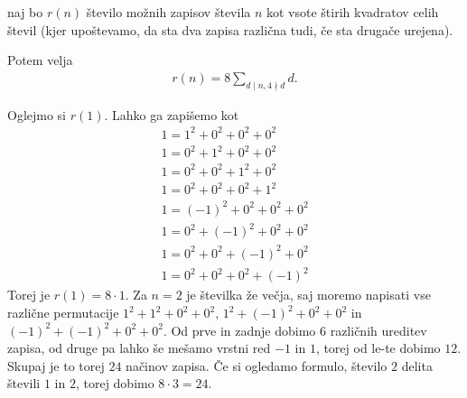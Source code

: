 \begin{izrek}
    \label{jacobi-four-squares}
    naj bo \(r(n)\) število možnih zapisov števila \(n\) kot vsote štirih kvadratov celih števil (kjer upoštevamo, da sta dva zapisa različna tudi, če sta drugače urejena).

    Potem velja
    \begin{align*}
        r(n) = 8\sum_{d\mid n, 4\nmid d} d.
    \end{align*}
\end{izrek}
\begin{primer}
    Oglejmo si \(r(1)\).
    Lahko ga zapišemo kot
    \begin{align*}
        1 = 1^2 + 0^2 + 0^2 + 0^2    \\
        1 = 0^2 + 1^2 + 0^2 + 0^2    \\
        1 = 0^2 + 0^2 + 1^2 + 0^2    \\
        1 = 0^2 + 0^2 + 0^2 + 1^2    \\
        1 = (-1)^2 + 0^2 + 0^2 + 0^2 \\
        1 = 0^2 + (-1)^2 + 0^2 + 0^2 \\
        1 = 0^2 + 0^2 + (-1)^2 + 0^2 \\
        1 = 0^2 + 0^2 + 0^2 + (-1)^2
    \end{align*}
    Torej je \(r(1) = 8 \cdot 1\). Za \(n=2\) je številka že večja, saj moremo napisati vse različne permutacije \(1^2 + 1^2+0^2+0^2\), \(1^2 + (-1)^2+0^2+0^2\) in \((-1)^2 + (-1)^2+0^2+0^2\). Od prve in zadnje dobimo \(6\) različnih ureditev zapisa, od druge pa lahko še mešamo vrstni red \(-1\) in \(1\), torej od le-te dobimo \(12\). Skupaj je to torej \(24\) načinov zapisa. Če si ogledamo formulo, število \(2\) delita števili \(1\) in \(2\), torej dobimo \(8\cdot 3 = 24\).
\end{primer}
